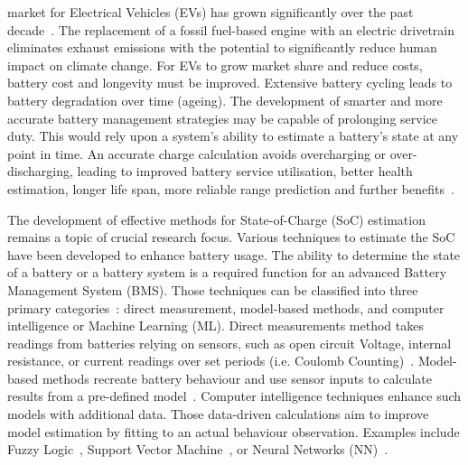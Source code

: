  market for Electrical Vehicles (EVs) has grown significantly over the past decade~\cite{state-ev-australia}.
The replacement of a fossil fuel-based engine with an electric drivetrain eliminates exhaust emissions with the potential to significantly reduce human impact on climate change.
For EVs to grow market share and reduce costs, battery cost and longevity must be improved.
Extensive battery cycling leads to battery degradation over time (ageing).
The development of smarter and more accurate battery management strategies may be capable of prolonging service duty.
This would rely upon a system's ability to estimate a battery's state at any point in time.
An accurate charge calculation avoids overcharging or over-discharging, leading to improved battery service utilisation, better health estimation, longer life span, more reliable range prediction and further benefits~\cite{calif_proper_2008}.

%
%
The development of effective methods for State-of-Charge (SoC) estimation remains a topic of crucial research focus.
Various techniques to estimate the SoC have been developed to enhance battery usage.
The ability to determine the state of a battery or a battery system is a required function for an advanced Battery Management System (BMS).
Those techniques can be classified into three primary categories~\cite{ali_towards_2019,ng_enhanced_2009,robust_SoC,6953745}: direct measurement, model-based methods, and computer intelligence or Machine Learning (ML).
Direct measurements method takes readings from batteries relying on sensors, such as open circuit Voltage, internal resistance, or current readings over set periods (i.e. Coulomb Counting)~\cite{ng_enhanced_2009,robust_SoC}.
Model-based methods recreate battery behaviour and use sensor inputs to calculate results from a pre-defined model~\cite{6953745}.
Computer intelligence techniques enhance such models with additional data.
Those data-driven calculations aim to improve model estimation by fitting to an actual behaviour observation.
Examples include Fuzzy Logic~\cite{malkhandi_fuzzy_2006}, Support Vector Machine~\cite{hansen_support_2005, anton_battery_2013}, or Neural Networks (NN)~\cite{song_lithium-ion_2018,Chemali2017,mamo_long_2020,jiao_gru-rnn_2020,xiao_accurate_2019,javid_adaptive_2020,zhang_deep_2020}.

